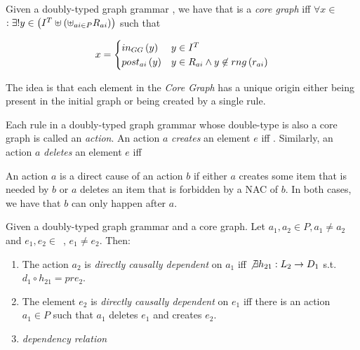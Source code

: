 \begin{definition} Given a doubly-typed graph grammar \doublyTypedGraphGrammarCore{}, we have that \coreGraph{} is a \emph{core graph} iff $\forall x \in$ \coreGraph $: \exists! y \in \left(I^T \uplus \left(\uplus_{ai \in P} R_{ai}\right)\right)$ such that

  \[ x =
    \begin{cases}
      in_{GG}\left(y\right) & y \in I^T\\
      post_{ai}\left(y\right) & y \in R_{ai} \land y \not\in rng\left(r_{ai}\right)\\
    \end{cases}
   \]

  \begin{intuition} The idea is that each element in the \emph{Core Graph} has a unique origin either being present in the initial graph or being created by a single rule.
\end{intuition}

  Each rule in a doubly-typed graph grammar whose double-type is also a core graph is called an \emph{action}. An action $a$ \emph{creates} an element $e$ iff . Similarly, an action $a$ \emph{deletes} an element $e$ iff

\end{definition}

\begin{intuition} An action $a$ is a direct cause of an action $b$ if either $a$ creates some item that is needed by $b$ or $a$ deletes an item that is forbidden by a NAC of $b$. In both cases, we have that $b$ can only happen after $a$. 
\end{intuition}

\begin{definition} Given \doublyTypedGraphGrammarCore{} a doubly-typed graph grammar and \coreGraph{} a core graph. Let $a_1, a_2 \in P, a_1 \ne a_2$ and \mbox{$e_1, e_2 \in $ \coreGraph{},} $e_1 \ne e_2$. Then: 

  \begin{enumerate}
    \item The action $a_2$ is \emph{directly causally dependent} on $a_1$ iff $\not\exists h_{21} : L_2 \rightarrow D_1$ s.t. \mbox{$d_1 \circ h_{21} = pre_2$}.

    \item The element $e_2$ is \emph{directly causally dependent} on $e_1$ iff there is an action $a_1 \in P$ such that $a_1$ deletes $e_1$ and creates $e_2$.
    \item \emph{dependency relation}
  \end{enumerate}

\end{definition}


